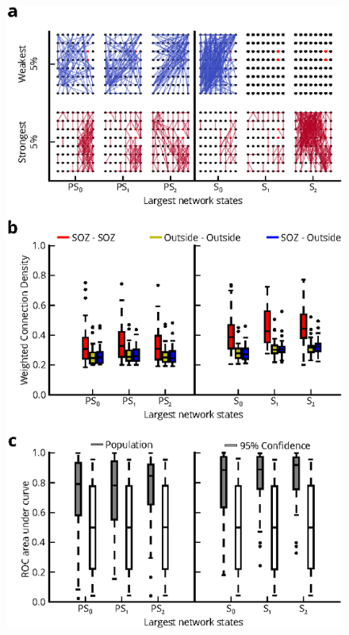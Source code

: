 \begin{figure}[H]
    \centering
    \includegraphics[height=0.75\textheight]{panel5.eps}

\end{figure}
